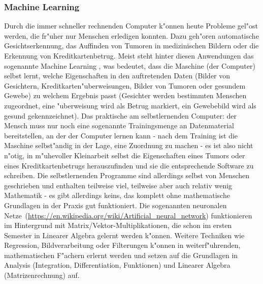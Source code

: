 \subsubsection{Machine Learning}
Durch die immer schneller rechnenden Computer k"onnen heute Probleme gel"ost werden, die fr"uher nur Menschen erledigen konnten. Dazu geh"oren automatische Gesichtserkennung, das Auffinden von Tumoren in medizinischen Bildern oder die Erkennung von Kreditkartenbetrug. Meist steht hinter diesen Anwendungen das sogenannte \glqq Machine Learning \grqq, was bedeutet, dass die Maschine (der Computer) selbst lernt, welche Eigenschaften in den auftretenden Daten (Bilder von Gesichtern, Kreditkarten"uberweisungen, Bilder von Tumoren oder gesundem Gewebe) zu welchem Ergebnis passt (Gesichter werden bestimmten Menschen zugeordnet, eine "uberweisung wird als Betrug markiert, ein Gewebebild wird als gesund gekennzeichnet). Das praktische am selbstlernenden Computer: der Mensch muss nur noch eine sogenannte Trainingsmenge an Datenmaterial bereitstellen, an der der Computer lernen kann - nach dem Training ist die Maschine selbst"andig in der Lage, eine Zuordnung zu machen - es ist also nicht n"otig, in m"uhevoller Kleinarbeit selbst die Eigenschaften eines Tumors oder eines Kreditkartenbetrugs herauszufinden und sie die entsprechende Software zu schreiben.
Die selbstlernenden Programme sind allerdings selbst von Menschen geschrieben und enthalten teilweise viel, teilweise aber auch relativ wenig Mathematik - es gibt allerdings keins, das komplett ohne mathematische Grundlagen in der Praxis gut funktioniert. Die sogenannten \glqq neuronalen Netze\grqq \ (\url{https://en.wikipedia.org/wiki/Artificial_neural_network}) funktionieren im Hintergrund mit Ma\-trix/\-Vektor-\-Multiplikationen, die schon im ersten Semester in Linearer Algebra gelernt werden k"onnen. Weitere Techniken wie Regression, Bildverarbeitung oder Filterungen k"onnen in weiterf"uhrenden, mathematischen F"achern erlernt werden und setzen auf die Grundlagen in Analysis (Integration, Differentiation, Funktionen) und Linearer Algebra (Matrizenrechnung) auf.